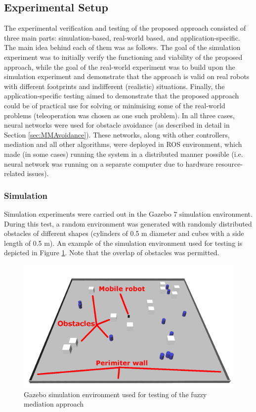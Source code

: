 \subsection{Experimental Setup}
\label{sec:MediationExperiment}

The experimental verification and testing of the proposed approach consisted of three main parts: simulation-based, real-world based, and application-specific. The main idea behind each of them was as follows. The goal of the simulation experiment was to initially verify the functioning and viability of the proposed approach, while the goal of the real-world experiment was to build upon the simulation experiment and demonstrate that the approach is valid on real robots with different footprints and indifferent (realistic) situations. Finally, the application-specific testing aimed to demonstrate that the proposed approach could be of practical use for solving or minimising some of the real-world problems (teleoperation was chosen as one such problem). 
In all three cases, neural networks were used for obstacle avoidance (as described in detail in Section \ref{sec:MMAvoidance}). These networks, along with other controllers, mediation and all other algorithms, were deployed in ROS environment, which made (in some cases) running the system in a distributed manner possible (i.e. neural network was running on a separate computer due to hardware resource-related issues).

\subsubsection{Simulation} \label{sec:MediationSimulation}
Simulation experiments were carried out in the Gazebo 7 simulation environment. During this test, a random environment was generated with randomly distributed obstacles of different shapes (cylinders of 0.5 m diameter and cubes with a side length of 0.5 m). An example of the simulation environment used for testing is depicted in Figure \ref{Fig:Gazebo3D}. Note that the overlap of obstacles was permitted.

\begin{figure}
\centering
\includegraphics[width=0.7\columnwidth]{slike/Fig03_14.png}
\caption{Gazebo simulation environment used for testing of the fuzzy mediation approach}
\label{Fig:Gazebo3D}
\end{figure}

